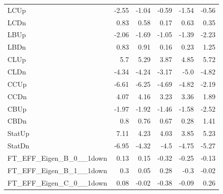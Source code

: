 \begin{table}[htbp]
{\begin{tabular}{lrrrrr}
LCUp                               & -2.55            & -1.04              & -0.59              & -1.54              & -0.56              \\
LCDn                               & 0.83             & 0.58               & 0.17               & 0.63               & 0.35               \\
LBUp                               & -2.06            & -1.69              & -1.05              & -1.39              & -2.23              \\
LBDn                               & 0.83             & 0.91               & 0.16               & 0.23               & 1.25               \\
CLUp                               & 5.7              & 5.29               & 3.87               & 4.85               & 5.72               \\
CLDn                               & -4.34            & -4.24              & -3.17              & -5.0               & -4.82              \\
CCUp                               & -6.61            & -6.25              & -4.69              & -4.82              & -2.19              \\
CCDn                               & 4.07             & 4.16               & 3.23               & 3.36               & 1.89               \\
CBUp                               & -1.97            & -1.92              & -1.46              & -1.58              & -2.52              \\
CBDn                               & 0.8              & 0.76               & 0.67               & 0.28               & 1.41               \\
StatUp                             & 7.11             & 4.23               & 4.03               & 3.85               & 5.23               \\
StatDn                             & -6.95            & -4.32              & -4.5               & -4.75              & -5.27              \\
FT\_EFF\_Eigen\_B\_0\_\_1down      & 0.13             & 0.15               & -0.32              & -0.25              & -0.13              \\
FT\_EFF\_Eigen\_B\_1\_\_1down      & 0.3              & 0.05               & 0.28               & -0.3               & -0.02              \\
FT\_EFF\_Eigen\_C\_0\_\_1down      & 0.08             & -0.02              & -0.38              & -0.09              & 0.26               \\

\end{tabular}}
\end{table}

